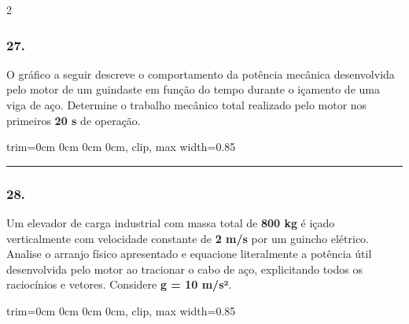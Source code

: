 \documentclass[twoside, 10pt, a4paper]{article}
\newlength{\espacoPreQuestao}\setlength{\espacoPreQuestao}{0.1cm}
\newlength{\espacoQuestao}\setlength{\espacoQuestao}{0.2cm}
\newcommand{\larguraTikz}{0.85\linewidth}
\begin{document}
\begin{multicols*}{2}
\subsubsection*{27.} O gráfico a seguir descreve o comportamento da potência mecânica desenvolvida pelo motor de um guindaste em função do tempo durante o içamento de uma viga de aço. Determine o trabalho mecânico total realizado pelo motor nos primeiros \textbf{20 s} de operação.
\begin{center}
\begin{adjustbox}{trim=0cm 0cm 0cm 0cm, clip, max width=\larguraTikz}
\end{adjustbox}
\end{center}
\par\vspace{\espacoQuestao}

\noindent\textcolor{CorLinha}{\rule{\linewidth}{0.5pt}} 
\par\vspace{\espacoPreQuestao}
\subsubsection*{28.} Um elevador de carga industrial com massa total de \textbf{800 kg} é içado verticalmente com velocidade constante de \textbf{2 m/s} por um guincho elétrico. Analise o arranjo físico apresentado e equacione literalmente a potência útil desenvolvida pelo motor ao tracionar o cabo de aço, explicitando todos os raciocínios e vetores. Considere \textbf{g = 10 m/s²}.
\begin{center}
\begin{adjustbox}{trim=0cm 0cm 0cm 0cm, clip, max width=\larguraTikz}
\end{adjustbox}
\end{center}
\end{multicols*}
\end{document}
